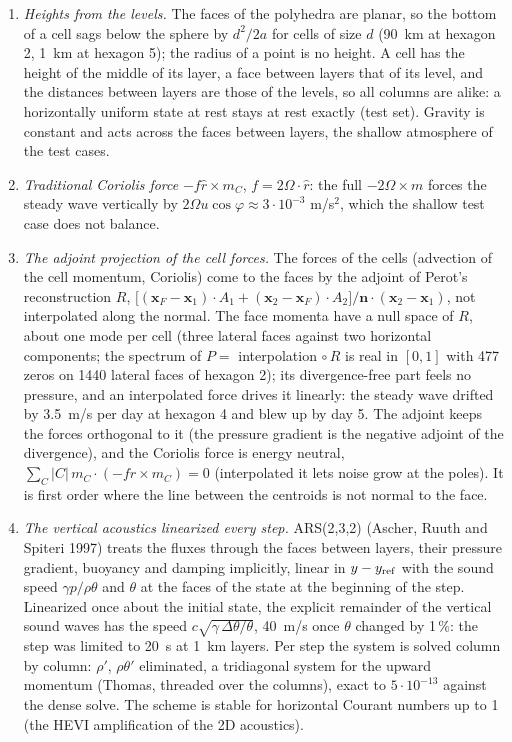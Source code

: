 \documentclass[11pt,a4paper]{article}
\newcommand{\bn}{\mathbf{n}}
\newcommand{\bx}{\mathbf{x}}
\begin{document}
\begin{enumerate}
\item \emph{Heights from the levels.} The faces of the polyhedra are planar, so the bottom of a cell
  sags below the sphere by $d^2/2a$ for cells of size $d$ (90~km at hexagon 2, 1~km at hexagon 5);
  the radius of a point is no height. A cell has the height of the middle of its layer, a face
  between layers that of its level, and the distances between layers are those of the levels, so all
  columns are alike: a horizontally uniform state at rest stays at rest exactly (test set). Gravity
  is constant and acts across the faces between layers, the shallow atmosphere of the test cases.
\item \emph{Traditional Coriolis force} $-f\hat r\times m_C$, $f = 2\Omega\cdot\hat r$: the full
  $-2\Omega\times m$ forces the steady wave vertically by $2\Omega u\cos\varphi\approx 3\cdot10^{-3}$
  m/s$^2$, which the shallow test case does not balance.
\item \emph{The adjoint projection of the cell forces.} The forces of the cells (advection of the
  cell momentum, Coriolis) come to the faces by the adjoint of Perot's reconstruction $R$,
  $\big[(\bx_F - \bx_1)\cdot A_1 + (\bx_2 - \bx_F)\cdot A_2\big]/\bn\cdot(\bx_2 - \bx_1)$, not
  interpolated along the normal. The face momenta have a null space of $R$, about one mode per cell
  (three lateral faces against two horizontal components; the spectrum of $P = $ interpolation
  $\circ\, R$ is real in $[0, 1]$ with 477 zeros on 1440 lateral faces of hexagon 2); its
  divergence-free part feels no pressure, and an interpolated force drives it linearly: the
  steady wave drifted by 3.5~m/s per day at hexagon 4 and blew up by day 5. The adjoint keeps the
  forces orthogonal to it (the pressure gradient is the negative adjoint of the divergence), and the
  Coriolis force is energy neutral, $\sum_C |C|\, m_C\cdot(-f\hat r\times m_C) = 0$ (interpolated it
  lets noise grow at the poles). It is first order where the line between the centroids is not
  normal to the face.
\item \emph{The vertical acoustics linearized every step.} ARS(2,3,2) (Ascher, Ruuth and Spiteri
  1997) treats the fluxes through the faces between layers, their pressure gradient, buoyancy and
  damping implicitly, linear in $y - y_{\rm ref}$ with the sound speed $\gamma p/\rho\theta$ and
  $\theta$ at the faces of the state at the beginning of the step. Linearized once about the
  initial state, the explicit remainder of the vertical sound waves has the speed
  $c\sqrt{\gamma\,\Delta\theta/\theta}$, 40~m/s once $\theta$ changed by 1\,\%: the step was limited
  to 20~s at 1~km layers. Per step the system is solved column by column: $\rho'$, $\rho\theta'$
  eliminated, a tridiagonal system for the upward momentum (Thomas, threaded over the columns),
  exact to $5\cdot10^{-13}$ against the dense solve. The scheme is stable for horizontal Courant
  numbers up to 1 (the HEVI amplification of the 2D acoustics).
\end{enumerate}
\end{document}
